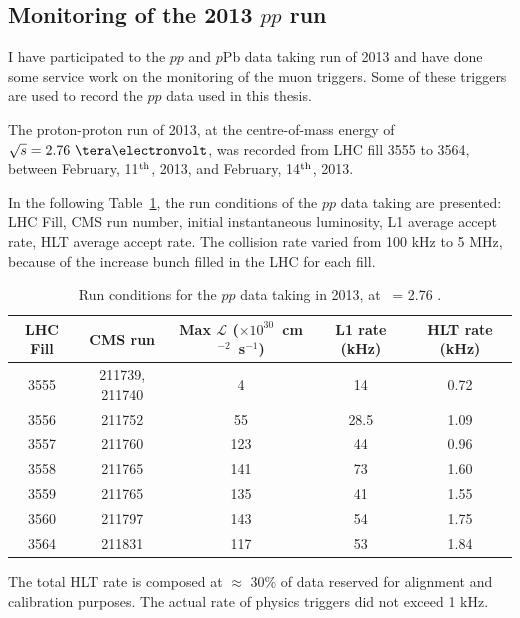 \subsection{Monitoring of the 2013 \texorpdfstring{$pp$}{pp} run}
\label{sec:pp2013}

I have participated to the $pp$ and $p$Pb data taking run of 2013 and
have done some service work on the monitoring of the muon
triggers. Some of these triggers are used to record the $pp$ data used in 
this thesis.

The proton-proton run of 2013, at the centre-of-mass energy of $\s =
2.76~\TeV$, was recorded from LHC fill 3555 to 3564, between February,
11$^{\rm th}$, 2013, and February, 14$^{\rm th}$, 2013.


In the following Table~\ref{tab:runconditions_pp}, the run conditions
of the $pp$ data taking are presented: LHC Fill, CMS run number,
initial instantaneous luminosity, L1 average accept rate, HLT average
accept rate. The
collision rate varied from 100 kHz to 5 MHz, because of the increase
bunch filled in the LHC for each fill.


\begin{table}[h]
  \begin{center}
    \begin{tabular}{|c|c|c|c|c|}
      \hline
      LHC Fill & CMS run & Max $\mathcal{L}$ ($\times
      10^{30}$~cm$^{-2}$~s$^{-1}$)& L1 rate (kHz) & HLT rate (kHz)\\
      \hline
      \hline
      3555 & 211739, 211740& 4 & 14 & 0.72 \\
      3556 & 211752& 55 & 28.5 & 1.09\\
      3557 & 211760& 123 & 44 & 0.96\\
      3558 & 211765& 141 & 73 & 1.60\\
      3559 & 211765& 135 & 41 & 1.55\\
      3560 & 211797& 143 & 54 & 1.75\\
      3564 & 211831& 117 & 53 & 1.84\\
      \hline
    \end{tabular}
  \end{center}
  \caption{Run conditions for the $pp$ data taking in 2013, at \s\ =
    2.76 \TeV.}
\label{tab:runconditions_pp}
\end{table}

The total HLT rate is composed at $\approx$ 30\% of data reserved for alignment
and calibration purposes. The actual rate of physics triggers did not exceed 1
kHz.


